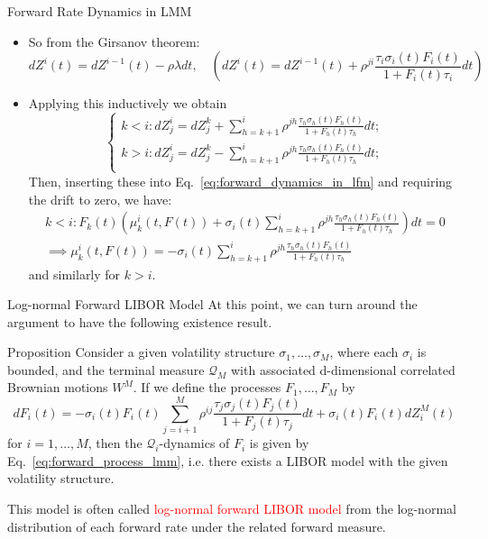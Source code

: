 \documentclass{beamer}
\begin{document}
\begin{frame}{Forward Rate Dynamics in LMM}
  \begin{itemize}
  \item So from the Girsanov theorem:
    \begin{equation*}
      dZ^i(t) = dZ^{i-1}(t)-\rho\lambda dt,\quad \left(dZ^i(t) = dZ^{i-1}(t)+\rho^{ji}\frac{\tau_i\sigma_i(t)F_i(t)}{1+F_i(t)\tau_i} dt\right)
    \end{equation*}
  \item Applying this inductively we obtain
    \begin{equation*}
      \begin{cases}
	k < i : dZ^i_j = dZ^k_j + \sum_{h=k+1}^i \rho^{jh}\frac{\tau_h\sigma_h(t)F_h(t)}{1+F_h(t)\tau_h} dt;\\
	k > i : dZ^i_j = dZ^k_j - \sum_{h=k+1}^i \rho^{jh}\frac{\tau_h\sigma_h(t)F_h(t)}{1+F_h(t)\tau_h} dt;\\
      \end{cases}
    \end{equation*}
    Then, inserting these into Eq.~\ref{eq:forward_dynamics_in_lfm} and requiring the drift to zero, we have:
    \begin{equation*}
      \begin{gathered}
	k < i : F_k(t)\left( \mu_k^i(t, F(t)) + \sigma_i(t)\sum_{h=k+1}^i \rho^{jh} \frac{\tau_h\sigma_h(t)F_h(t)}{1+F_h(t)\tau_h}\right) dt = 0 \\
	\implies \mu_k^i(t, F(t)) = - \sigma_i(t)\sum_{h=k+1}^i \rho^{jh} \frac{\tau_h\sigma_h(t)F_h(t)}{1+F_h(t)\tau_h}
      \end{gathered}
    \end{equation*}
    and similarly for $k > i$.
  \end{itemize}
\end{frame}

\begin{frame}{Log-normal Forward LIBOR Model}
  At this point, we can turn around the argument to have the following existence result.
  \begin{block}{Proposition}
    Consider a given volatility structure $\sigma_1,\ldots, \sigma_M$, where each $\sigma_i$ is bounded, and the terminal measure $\mathcal{Q}_M$ with associated d-dimensional correlated Brownian motions $W^M$. If we define the processes $F_1,\ldots, F_M$ by
    \begin{equation}
      dF_i(t) = -\sigma_i(t)F_i(t)\sum_{j=i+1}^M \rho^{ij} \frac{\tau_j\sigma_j(t)F_j(t)}{1+F_j(t)\tau_j} dt + \sigma_i(t)F_i(t)dZ^M_i(t)
    \end{equation}
    for $i = 1,\ldots, M$, then the $\mathcal{Q}_i$-dynamics of $F_i$ is given by Eq.~\ref{eq:forward_process_lmm}, i.e. there exists a LIBOR model with the given volatility structure.
  \end{block}
  This model is often called \textcolor{red}{log-normal forward LIBOR model} from the log-normal distribution of each forward rate under the related forward measure.
\end{frame}
\end{document}

